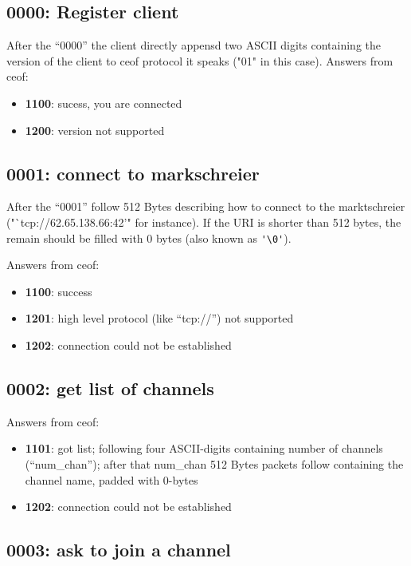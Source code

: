 \documentclass[12pt,a4paper]{article}
\begin{document}
\subsection{0000: Register client}
After the "`0000"' the client directly appensd two ASCII digits containing the
version of the client to ceof protocol it speaks ("01" in this case).
Answers from ceof:
\begin{itemize}
\item \textbf{1100}: sucess, you are connected
\item \textbf{1200}: version not supported
\end{itemize}


\subsection{0001: connect to markschreier}

After the "`0001"' follow 512 Bytes describing how to connect
to the marktschreier ("`tcp://62.65.138.66:42'" for instance).
If the URI is shorter than 512 bytes, the remain should be filled with 0 bytes
(also known as \verb='\0'=).

Answers from ceof:

\begin{itemize}
\item \textbf{1100}: success
\item \textbf{1201}: high level protocol (like "`tcp://"') not supported
\item \textbf{1202}: connection could not be established
\end{itemize}


\subsection{0002: get list of channels}

Answers from ceof:

\begin{itemize}
\item \textbf{1101}: got list; following four ASCII-digits containing number of channels
 ("`num\_chan"'); after that  num\_chan 512 Bytes packets follow containing the channel name, padded with 0-bytes
\item \textbf{1202}: connection could not be established
\end{itemize}


\subsection{0003: ask to join a channel}
\end{document}
